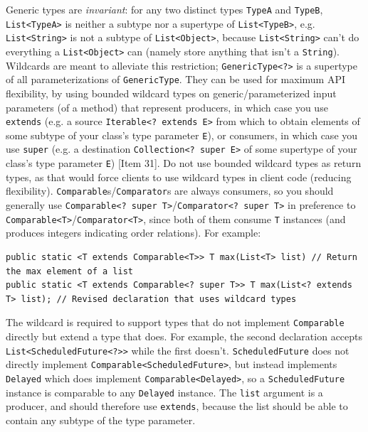 \documentclass[table, xcdraw]{article}%
\begin{document}
Generic types are \emph{invariant}: for any two distinct types \texttt{TypeA} and \texttt{TypeB}, \texttt{List<TypeA>} is neither a subtype nor a supertype of \texttt{List<TypeB>}, e.g. \texttt{List<String>} is not a subtype of \texttt{List<Object>}, because \texttt{List<String>} can't do everything a \texttt{List<Object>} can (namely store anything that isn't a \texttt{String}). Wildcards are meant to alleviate this restriction; \texttt{GenericType<?>} is a supertype of all parameterizations of \texttt{GenericType}. They can be used for maximum API flexibility, by using bounded wildcard types on generic/parameterized input parameters (of a method) that represent producers, in which case you use \texttt{extends} (e.g. a source \texttt{Iterable<? extends E>} from which to obtain elements of some subtype of your class's type parameter \texttt{E}), or consumers, in which case you use \texttt{super} (e.g. a destination \texttt{Collection<? super E>} of some supertype of your class's type parameter \texttt{E}) [Item 31]. Do not use bounded wildcard types as return types, as that would force clients to use wildcard types in client code (reducing flexibility). \texttt{Comparable}s/\texttt{Comparator}s are always consumers, so you should generally use \texttt{Comparable<? super T>}/\texttt{Comparator<? super T>} in preference to \texttt{Comparable<T>}/\texttt{Comparator<T>}, since both of them consume \texttt{T} instances (and produces integers indicating order relations). For example:

\begin{verbatim}
public static <T extends Comparable<T>> T max(List<T> list) // Return the max element of a list
public static <T extends Comparable<? super T>> T max(List<? extends T> list); // Revised declaration that uses wildcard types
\end{verbatim}

The wildcard is required to support types that do not implement \texttt{Comparable} directly but extend a type that does. For example, the second declaration accepts \texttt{List<ScheduledFuture<?>>} while the first doesn't. \texttt{ScheduledFuture} does not directly implement \texttt{Comparable<ScheduledFuture>}, but instead implements \texttt{Delayed} which does implement \texttt{Comparable<Delayed>}, so a \texttt{ScheduledFuture} instance is comparable to any \texttt{Delayed} instance. The \texttt{list} argument is a producer, and should therefore use \texttt{extends}, because the list should be able to contain any subtype of the type parameter.
\end{document}
